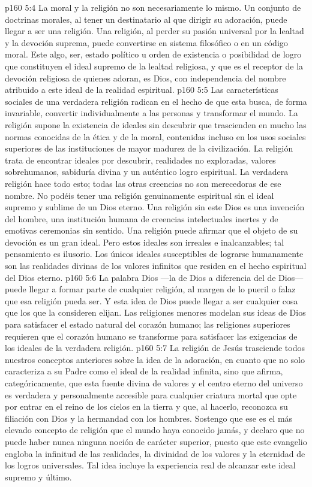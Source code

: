 \vs p160 5:4 La moral y la religión no son necesariamente lo mismo. Un conjunto de doctrinas morales, al tener un destinatario al que dirigir su adoración, puede llegar a ser una religión. Una religión, al perder su pasión universal por la lealtad y la devoción suprema, puede convertirse en sistema filosófico o en un código moral. Este algo, ser, estado político u orden de existencia o posibilidad de logro que constituyen el ideal supremo de la lealtad religiosa, y que es el receptor de la devoción religiosa de quienes adoran, es Dios, con independencia del nombre atribuido a este ideal de la realidad espiritual.
\vs p160 5:5 Las características sociales de una verdadera religión radican en el hecho de que esta busca, de forma invariable, convertir individualmente a las personas y transformar el mundo. La religión supone la existencia de ideales sin descubrir que trascienden en mucho las normas conocidas de la ética y de la moral, contenidas incluso en los usos sociales superiores de las instituciones de mayor madurez de la civilización. La religión trata de encontrar ideales por descubrir, realidades no exploradas, valores sobrehumanos, sabiduría divina y un auténtico logro espiritual. La verdadera religión hace todo esto; todas las otras creencias no son merecedoras de ese nombre. No podéis tener una religión genuinamente espiritual sin el ideal supremo y sublime de un Dios eterno. Una religión sin este Dios es una invención del hombre, una institución humana de creencias intelectuales inertes y de emotivas ceremonias sin sentido. Una religión puede afirmar que el objeto de su devoción es un gran ideal. Pero estos ideales son irreales e inalcanzables; tal pensamiento es ilusorio. Los únicos ideales susceptibles de lograrse humanamente son las realidades divinas de los valores infinitos que residen en el hecho espiritual del Dios eterno.
\vs p160 5:6 La palabra Dios ---la  de Dios a diferencia del  de Dios--- puede llegar a formar parte de cualquier religión, al margen de lo pueril o falaz que esa religión pueda ser. Y esta idea de Dios puede llegar a ser cualquier cosa que los que la consideren elijan. Las religiones menores modelan sus ideas de Dios para satisfacer el estado natural del corazón humano; las religiones superiores requieren que el corazón humano se transforme para satisfacer las exigencias de los ideales de la verdadera religión.
\vs p160 5:7 \pc La religión de Jesús trasciende todos nuestros conceptos anteriores sobre la idea de la adoración, en cuanto que no solo caracteriza a su Padre como el ideal de la realidad infinita, sino que afirma, categóricamente, que esta fuente divina de valores y el centro eterno del universo es verdadera y personalmente accesible para cualquier criatura mortal que opte por entrar en el reino de los cielos en la tierra y que, al hacerlo, reconozca su filiación con Dios y la hermandad con los hombres. Sostengo que ese es el más elevado concepto de religión que el mundo haya conocido jamás, y declaro que no puede haber nunca ninguna noción de carácter superior, puesto que este evangelio engloba la infinitud de las realidades, la divinidad de los valores y la eternidad de los logros universales. Tal idea incluye la experiencia real de alcanzar este ideal supremo y último.
